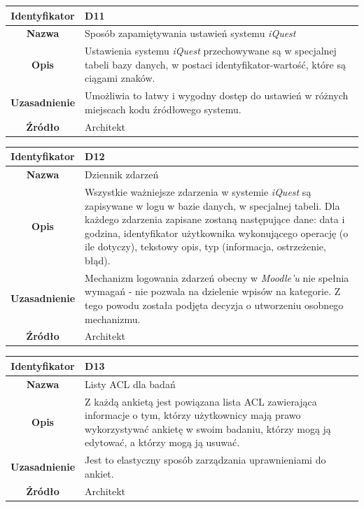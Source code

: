 \begin{table}[H]
\centering
\begin{tabular}{ | >{\bfseries}c | p{11cm} | }
\hline
%
Identyfikator & D11 \\ \hline
Nazwa & Sposób zapamiętywania ustawień systemu \textit{iQuest}  \\ \hline
Opis & Ustawienia systemu \textit{iQuest} przechowywane są w specjalnej tabeli bazy danych, w postaci identyfikator-wartość, które są ciągami znaków. \\ \hline
Uzasadnienie & Umożliwia to łatwy i wygodny dostęp do ustawień w różnych miejscach kodu źródłowego systemu. \\ \hline
Źródło & Architekt \\ \hline
%
\end{tabular}
\end{table}

\begin{table}[H]
\centering
\begin{tabular}{ | >{\bfseries}c | p{11cm} | }
\hline
%
Identyfikator & D12 \\ \hline
Nazwa & Dziennik zdarzeń \\ \hline
Opis & Wszystkie ważniejsze zdarzenia w systemie \textit{iQuest} są zapisywane w logu w bazie danych, w specjalnej tabeli. Dla każdego zdarzenia zapisane zostaną następujące dane: data i godzina, identyfikator użytkownika wykonującego operację (o ile dotyczy), tekstowy opis, typ (informacja, ostrzeżenie, błąd). \\ \hline
Uzasadnienie & Mechanizm logowania zdarzeń obecny w \textit{Moodle'u} nie spełnia wymagań - nie pozwala na dzielenie wpisów na kategorie. Z tego powodu została podjęta decyzja o utworzeniu osobnego mechanizmu. \\ \hline
Źródło & Architekt \\ \hline
%
\end{tabular}
\end{table}

\begin{table}[H]
\centering
\begin{tabular}{ | >{\bfseries}c | p{11cm} | }
\hline
%
Identyfikator & D13 \\ \hline
Nazwa & Listy ACL dla badań \\ \hline
Opis & Z każdą ankietą jest powiązana lista ACL zawierająca informacje o tym, którzy użytkownicy mają prawo wykorzystywać ankietę w swoim badaniu, którzy mogą ją edytować, a którzy mogą ją usuwać. \\ \hline
Uzasadnienie & Jest to elastyczny sposób zarządzania uprawnieniami do ankiet. \\ \hline
Źródło & Architekt \\ \hline
%
\end{tabular}
\end{table}

